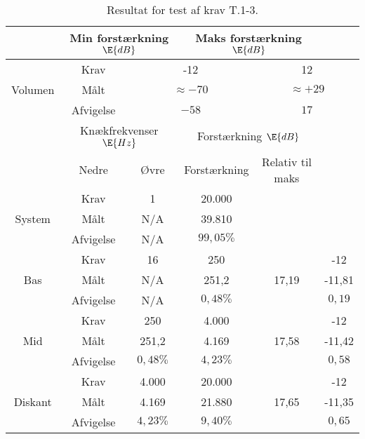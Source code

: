 \begin{longtable}{|c|c|c|c|c|c|}
    \caption{Resultat for test af krav T.1-3.}
    \label{tab:accepttestResultatBehandlingFrekvens}\\
        \hline
        \rowcolor{gray!50}
        \multicolumn{2}{|c|}{}& \multicolumn{2}{c|}{Min forstærkning $\E{dB}$}& \multicolumn{2}{c|}{Maks forstærkning $\E{dB}$} \\\hline
         & Krav & \multicolumn{2}{c|}{-12} & \multicolumn{2}{c|}{12}\\\cline{2-6}
       Volumen & Målt & \multicolumn{2}{c|}{$\approx-70$} &\multicolumn{2}{c|}{$\approx+29$}\\\cline{2-6}
        & Afvigelse & \multicolumn{2}{c|}{\color{Green}$-58$} & \multicolumn{2}{c|}{\color{Green}$17$}\\\hline
        
        \rowcolor{gray!50}
        \multicolumn{2}{|c|}{}& \multicolumn{2}{c|}{Knækfrekvenser $\E{Hz}$} & \multicolumn{2}{c|}{Forstærkning $\E{dB}$} \\\cline{3-6}
       \rowcolor{gray!50}\multicolumn{2}{|c|}{} & Nedre & Øvre & Forstærkning & Relativ til maks \\\hline
       
       & Krav & 1 & 20.000 &  & \\\cline{2-6}
        System  & Målt & N/A  & 39.810 &  &  \\\cline{2-6}
         & Afvigelse & N/A & \color{Green}$99,05\%$ &  &  \\\hline
         & Krav & 16 & 250 &  & -12\\\cline{2-6}
        Bas  & Målt & N/A  & 251,2 & 17,19 & -11,81 \\\cline{2-6}
         & Afvigelse & N/A & \color{Green}$0,48\%$ &  & \color{Green}$0,19$ \\\hline
         
         & Krav & 250 & 4.000 &  & -12\\\cline{2-6}
        Mid  & Målt & 251,2 & 4.169 & 17,58 & -11,42 \\\cline{2-6}
         & Afvigelse & \color{Green}$0,48\%$ & \color{Green}$4,23\%$ &  & \color{Red}$0,58$ \\\hline
         
         & Krav & 4.000 & 20.000 &  & -12\\\cline{2-6}
        Diskant  & Målt & 4.169 & 21.880 & 17,65 & -11,35 \\\cline{2-6}
         & Afvigelse & \color{Green}$4,23\%$ & \color{Red}$9,40\%$ &  & \color{Red}$0,65$ \\\hline
\end{longtable}

